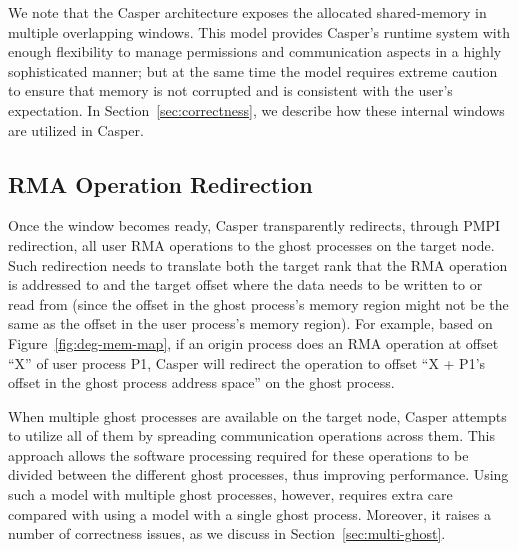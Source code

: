 We note that the Casper architecture exposes the allocated
shared-memory in multiple overlapping windows.  This model provides
Casper's runtime system with enough flexibility to manage permissions
and communication aspects in a highly sophisticated manner; but at the
same time the model requires extreme caution to ensure that memory is not
corrupted and is consistent with the user's expectation.  In
Section~\ref{sec:correctness}, we describe how these internal windows
are utilized in Casper.



\subsection{RMA Operation Redirection}\label{sec:des-op}

Once the window becomes ready, Casper transparently redirects, through
PMPI redirection, all user RMA operations to the ghost processes on
the target node.  Such redirection needs to translate both the target
rank that the RMA operation is addressed to and the target
offset where the data needs to be written to or read from (since the
offset in the ghost process's memory region might not be the same as
the offset in the user process's memory region).  For example, based on
Figure~\ref{fig:deg-mem-map}, if an origin process does an RMA
operation at offset ``X'' of user process P1, Casper will redirect the
operation to offset ``X + P1's offset in the ghost process address
space'' on the ghost process.

When multiple ghost processes are available on the target node, Casper
attempts to utilize all of them by spreading communication operations
across them.  This approach allows the software processing required for these
operations to be divided between the different ghost processes, thus
improving performance.  Using such a model with multiple ghost processes,
however, requires extra care compared with using a model with a single ghost process. Moreover, it
raises a number of correctness issues, as we discuss
in Section~\ref{sec:multi-ghost}.

